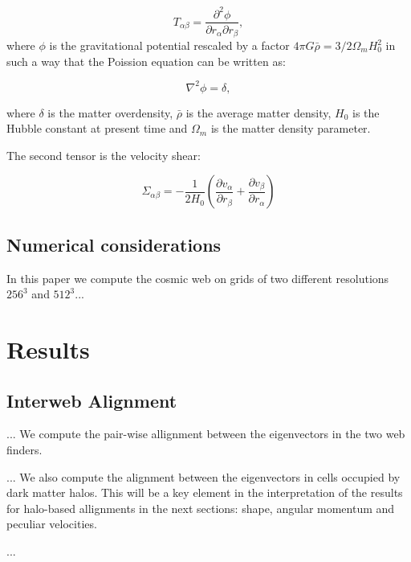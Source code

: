 \documentclass[usenatbib]{mn2e}
\begin{document}
\begin{equation}
T_{\alpha\beta} = \frac{\partial^2\phi}{\partial
  r_{\alpha}\partial r_{\beta}}, 
\end{equation}
where $\phi$ is the gravitational potential rescaled by a factor $4\pi
G\bar{\rho}=3/2\Omega_m H_{0}^2$ in such a way that the Poission
equation can be written as:

\begin{equation}
\nabla^{2}\phi  = \delta, 
\end{equation}

where $\delta$ is the matter overdensity, $\bar{\rho}$ is the average
matter density, $H_{0}$ is the Hubble constant at present time and
$\Omega_m$ is the matter density parameter.

The second tensor is the velocity shear:

\begin{equation}
\Sigma_{\alpha\beta} = -\frac{1}{2H_{0}}\left(\frac{\partial
  v_{\alpha}}{\partial r_{\beta}}+ \frac{\partial v_{\beta}}{\partial
  r_{\alpha}}\right) 
\end{equation}

\subsection{Numerical considerations}

In this paper we compute the cosmic web on grids of two different
resolutions $256^3$ and $512^3$...



\section{Results}

\subsection{Interweb Alignment}
... We compute the pair-wise allignment between the eigenvectors in
the two web finders. 

... We also compute the alignment between the eigenvectors in cells
occupied by dark matter halos. This will be a key element in the
interpretation of the results for halo-based allignments in the next
sections: shape, angular momentum and peculiar velocities.

... 

\end{document}
